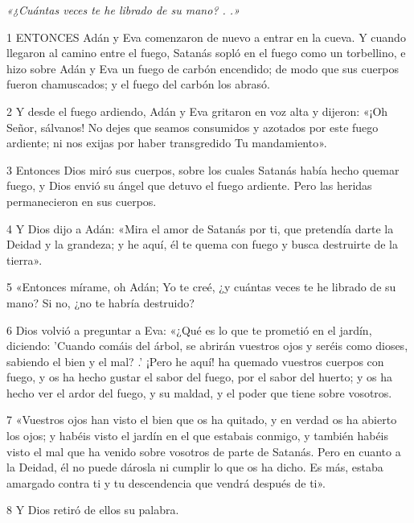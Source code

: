 \par \textit{«¿Cuántas veces te he librado de su mano? . .»}

\par 1 ENTONCES Adán y Eva comenzaron de nuevo a entrar en la cueva. Y cuando llegaron al camino entre el fuego, Satanás sopló en el fuego como un torbellino, e hizo sobre Adán y Eva un fuego de carbón encendido; de modo que sus cuerpos fueron chamuscados; y el fuego del carbón los abrasó.

\par 2 Y desde el fuego ardiendo, Adán y Eva gritaron en voz alta y dijeron: «¡Oh Señor, sálvanos! No dejes que seamos consumidos y azotados por este fuego ardiente; ni nos exijas por haber transgredido Tu mandamiento».

\par 3 Entonces Dios miró sus cuerpos, sobre los cuales Satanás había hecho quemar fuego, y Dios envió su ángel que detuvo el fuego ardiente. Pero las heridas permanecieron en sus cuerpos.

\par 4 Y Dios dijo a Adán: «Mira el amor de Satanás por ti, que pretendía darte la Deidad y la grandeza; y he aquí, él te quema con fuego y busca destruirte de la tierra».

\par 5 «Entonces mírame, oh Adán; Yo te creé, ¿y cuántas veces te he librado de su mano? Si no, ¿no te habría destruido?

\par 6 Dios volvió a preguntar a Eva: «¿Qué es lo que te prometió en el jardín, diciendo: 'Cuando comáis del árbol, se abrirán vuestros ojos y seréis como dioses, sabiendo el bien y el mal? .' ¡Pero he aquí! ha quemado vuestros cuerpos con fuego, y os ha hecho gustar el sabor del fuego, por el sabor del huerto; y os ha hecho ver el ardor del fuego, y su maldad, y el poder que tiene sobre vosotros.

\par 7 «Vuestros ojos han visto el bien que os ha quitado, y en verdad os ha abierto los ojos; y habéis visto el jardín en el que estabais conmigo, y también habéis visto el mal que ha venido sobre vosotros de parte de Satanás. Pero en cuanto a la Deidad, él no puede dárosla ni cumplir lo que os ha dicho. Es más, estaba amargado contra ti y tu descendencia que vendrá después de ti».

\par 8 Y Dios retiró de ellos su palabra.

